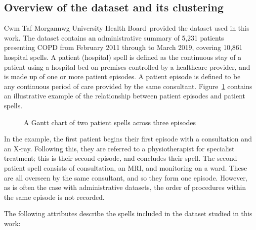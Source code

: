 \documentclass[]{interact}
\newlength{\imgwidth}
\theoremstyle{plain}%
\theoremstyle{definition}
\theoremstyle{remark}
\newcommand{\ctmuhb}{Cwm Taf Morgannwg University Health Board}
\begin{document}
\subsection{Overview of the dataset and its clustering}\label{subsec:overview}

\ctmuhb\ provided the dataset used in this work. The dataset contains an
administrative summary of 5,231 patients presenting COPD from February 2011
through to March 2019, covering 10,861 hospital spells. A patient (hospital)
spell is defined as the continuous stay of a patient using a hospital bed on
premises controlled by a healthcare provider, and is made up of one or more
patient episodes. A patient episode is defined to be any continuous period of
care provided by the same consultant. Figure~\ref{fig:spell} contains an
illustrative example of the relationship between patient episodes and patient
spells.

\begin{figure}
    \centering
    \resizebox{\imgwidth}{!}{}
    \caption{A Gantt chart of two patient spells across three episodes}
    \label{fig:spell}
\end{figure}

In the example, the first patient begins their first episode with a consultation
and an X-ray. Following this, they are referred to a physiotherapist for
specialist treatment; this is their second episode, and concludes their spell.
The second patient spell consists of consultation, an MRI, and monitoring on a
ward. These are all overseen by the same consultant, and so they form one
episode. However, as is often the case with administrative datasets, the order
of procedures within the same episode is not recorded.

The following attributes describe the spells included in the dataset studied in
this work:
\end{document}
